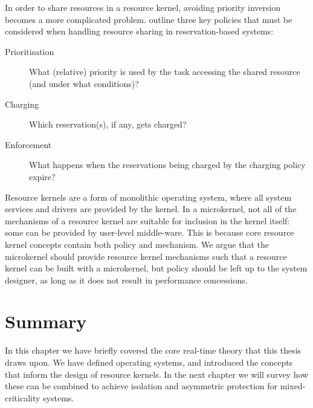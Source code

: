 In order to share resources in a resource kernel, avoiding priority inversion becomes a more complicated problem.
\citet{deNiz_LSR_01} outline three key policies that must be considered when handling resource sharing in reservation-based systems:

\begin{description}
    \item[Prioritisation] What (relative) priority is used by the task accessing the shared resource (and under what conditions)?
    \item[Charging] Which reservation(s), if any, gets charged?
    \item[Enforcement] What happens when the reservations being charged by the charging policy expire?
\end{description}

Resource kernels are a form of monolithic operating system, where all system services and drivers are provided by the kernel.
In a microkernel, not all of the mechanisms of a resource kernel are suitable for inclusion in the kernel itself: some can be provided by user-level middle-ware.
This is because core resource kernel concepts contain both policy and mechanism.
We argue that the microkernel should provide resource kernel mechanisms such that a resource kernel can be built with a microkernel, but policy should be left up to the system designer, as long as it does not result in performance concessions.

\section{Summary}

In this chapter we have briefly covered the core real-time theory that this thesis draws upon.
We have defined operating systems, and introduced the concepts that inform the design of resource kernels.
In the next chapter we will survey how these can be combined to achieve isolation and asymmetric protection for mixed-criticality systems.
